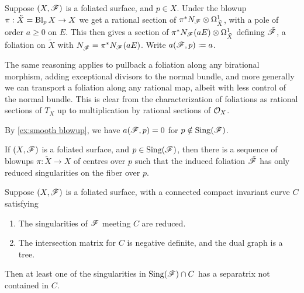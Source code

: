 \begin{definition}
    Suppose $(X,\mathscr{F})$ is a foliated surface, and $p\in X$. Under the blowup
    $\pi:\tilde X=\operatorname{Bl}_pX\to X$ we get a rational section of
    $\pi^*N_{\mathscr{F}}\otimes\Omega^1_{\tilde X}$, with a pole of order $a\ge0$ on
    $E$. This then gives a section of
    $\pi^*N_{\mathscr{F}}(aE)\otimes\Omega^1_{\tilde X}$ defining $\tilde{\mathscr{F}}$, a
    foliation on $\tilde X$ with $N_{\tilde{\mathscr{F}}}=\pi^*N_{\mathscr{F}}(aE)$. Write
    $a(\mathscr{F},p)\coloneqq a$.
\end{definition}

\begin{remark}
    The same reasoning applies to pullback a foliation along any birational
    morphism, adding exceptional divisors to the normal bundle, and more
    generally we can transport a foliation along any rational map, albeit with
    less control of the normal bundle. This is clear from the characterization
    of foliations as rational sections of $T_X$ up to multiplication by rational
    sections of $\mathcal{O}_X$.
\end{remark}

\begin{remark}
    By \cref{ex:smooth blowup}, we have $a(\mathscr{F},p)=0$ for
    $p\notin\operatorname{Sing}(\mathscr{F})$.
\end{remark}

\begin{theorem}\label{thm:seidenberg}
    If $(X,\mathscr{F})$ is a foliated surface, and $p\in\operatorname{Sing}(\mathscr{F})$, then there is
    a sequence of blowups $\pi:\tilde X\to X$ of centres over $p$ such that the
    induced foliation $\tilde{\mathscr{F}}$ has only reduced singularities on the fiber
    over $p$.
\end{theorem}

\begin{theorem}\label{thm:reduced separatrix}
    Suppose $(X,\mathscr{F})$ is a foliated surface, with a connected compact
    invariant curve $C$ satisfying
    \begin{enumerate}[label=\roman*.]
        \item The singularities of $\mathscr{F}$ meeting $C$ are reduced.
        \item The intersection matrix for $C$ is negative definite, and the dual
            graph is a tree.
    \end{enumerate}
    Then at least one of the singularities in $\operatorname{Sing}(\mathscr{F})\cap C$ has a
    separatrix not contained in $C$.
\end{theorem}

